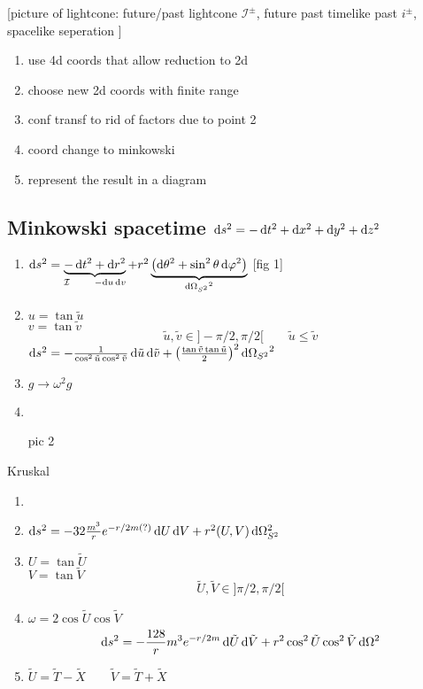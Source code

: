 [picture of lightcone:
future/past lightcone $\mathcal{I}^{\pm}$, future past timelike past $i^\pm$, spacelike seperation
]

\begin{enumerate}
\item use 4d coords that allow reduction to 2d
\item choose new 2d coords with finite range
\item conf transf to rid of factors due to point 2
\item coord change to minkowski
\item represent the result in a diagram
\end{enumerate}

\subsection[Minkowski spacetime ds² = -dt² + dx² + dy² + dz²]{Minkowski spacetime $\operatorname{d \!}{s}^2 = - \operatorname{d \!}{t}^2 + \operatorname{d \!}{x}^2 + \operatorname{d \!}{y}^2 + \operatorname{d \!}{z}^2$}
\begin{enumerate}
\item $\diff{s}^2 = \underbrace{- \diff{t}^2 + \diff{r}^2}_{\mathcal{I} \qquad - \diff{u}\diff{v}} + r^2 \underbrace{\left(\diff{\theta}^2 + \sin^2\theta \diff{\varphi}^2\right)}_{\diff{\Omega_{S^2}}^2}$
[fig 1]
\item $u = \tan \tilde{u}$ \\ $v = \tan \tilde{v}$
\[ \tilde{u}, \tilde{v} \in ]-\pi/2, \pi/2[ \qquad \tilde{u} \leq \tilde{v} \]
$\operatorname{d \!}{s}^2 = - \frac{1}{\cos^2 \tilde{u} \cos^2\tilde{v}}\operatorname{d \!}{\tilde{u}}\operatorname{d \!}{\tilde{v}} + \left(\frac{\tan\tilde{v}\tan\tilde{u}}{2}\right)^2 \operatorname{d \!}{\Omega_{S^2}}^2$
\item $g \to \omega^2 g \qquad$ 
\item
\item [pic 2]
\end{enumerate}

Kruskal
\begin{enumerate}
\item 
\item $\operatorname{d \!}{s}^2 = -32 \frac{m^3}{r}e^{-r/2m(?)} \operatorname{d \!}{U} \operatorname{d \!}{V} + r^2(U,V)\operatorname{d \!}{\Omega_{S^2}^2}$
\item $U = \tan \tilde{U}$ \\ $V = \tan \tilde{V}$
\[ \tilde{U}, \tilde{V} \in ]\pi/2, \pi/2[ \]
\item $\omega = 2\cos\tilde{U}\cos\tilde{V}$
\[ \operatorname{d \!}{s}^2 = - \frac{128}{r}m^3e^{-r/2m}\operatorname{d \!}{\tilde{U}}\operatorname{d \!}{\tilde{V}} + r^2\cos^2\tilde{U}\cos^2\tilde{V} \operatorname{d \!}{\Omega^2} \]
\item $\tilde{U} = \tilde{T} - \tilde{X} \qquad \tilde{V} = \tilde{T} + \tilde{X} $
\end{enumerate}


